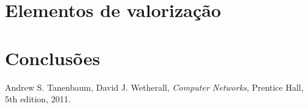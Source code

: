 \documentclass[a4paper,11pt,titlepage]{article}
\begin{document}
\section{Elementos de valorização}

\section{Conclusões}

\begin{thebibliography}{9}
  Andrew S. Tanenbaum,
  David J. Wetherall,
  \emph{Computer Networks},
  Prentice Hall, 
  5th edition,
  2011.
\end{thebibliography}
\end{document}

